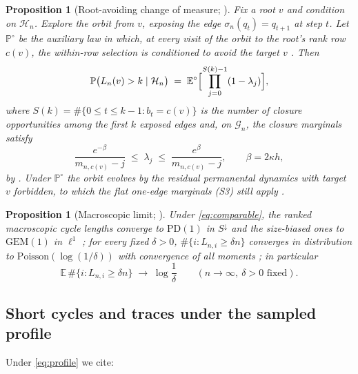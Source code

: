 \documentclass[11pt]{article}
\newcommand{\E}{\mathbb{E}}
\newcommand{\Prob}{\mathbb{P}}
\newcommand{\1}{\mathbf{1}}
\newcommand{\pd}{\mathrm{PD}(1)}
\newcommand{\GEM}{\mathrm{GEM}(1)}
\newcommand{\Poisson}{\mathrm{Poisson}}
\newcommand{\cG}{\mathcal{G}}
\newcommand{\cH}{\mathcal{H}}
\newtheorem{proposition}[theorem]{Proposition}
\theoremstyle{remark}
\begin{document}
\begin{proposition}[Root-avoiding change of measure; \cite{Lon26}]\label{prop:rootavoid}
Fix a root $v$ and condition on $\cH_n$. Explore the orbit from $v$, exposing
the edge $\sigma_n(q_t)=q_{t+1}$ at step $t$. Let $\Prob^\circ$ be the
auxiliary law in which, at every visit of the orbit to the root's rank row
$c(v)$, the within-row selection is conditioned to avoid the target $v$
\cite[Lemma~6.9]{Lon26}. Then
\begin{equation}\label{eq:survival}
\Prob\bigl(L_n(v)>k\mid\cH_n\bigr)
\;=\;\E^\circ\Bigl[\prod_{j=0}^{S(k)-1}(1-\lambda_j)\Bigr],
\end{equation}
where $S(k)=\#\{0\le t\le k-1:b_t=c(v)\}$ is the number of closure
opportunities among the first $k$ exposed edges and, on $\cG_n$, the closure
marginals satisfy
\begin{equation}\label{eq:hazard-bounds}
\frac{e^{-\beta}}{m_{n,c(v)}-j}\;\le\;\lambda_j\;\le\;
\frac{e^{\beta}}{m_{n,c(v)}-j},\qquad \beta=2\kappa h,
\end{equation}
by \cite[Lemmas~6.6, 6.9]{Lon26}. Under $\Prob^\circ$ the orbit evolves by the
residual permanental dynamics with target $v$ forbidden, to which the flat
one-edge marginals (S3) still apply \cite[Lemma~6.6]{Lon26}.
\end{proposition}

\begin{proposition}[Macroscopic limit; \cite{Lon26}]\label{prop:macro}
Under \eqref{eq:comparable}, the ranked macroscopic cycle lengths converge to
$\pd$ in $S^\downarrow$ and the size-biased ones to $\GEM$ in $\ell^1$
\cite[Theorem~6.1]{Lon26}; for every fixed $\delta>0$,
$\#\{i:L_{n,i}\ge\delta n\}$ converges in distribution to
$\Poisson(\log(1/\delta))$ with convergence of all moments
\cite[Proposition~6.14]{Lon26}; in particular
\begin{equation}\label{eq:macro-count}
\E\,\#\{i:L_{n,i}\ge\delta n\}\;\longrightarrow\;\log\frac1\delta
\qquad(n\to\infty,\ \delta>0\text{ fixed}).
\end{equation}
\end{proposition}

\subsection{Short cycles and traces under the sampled profile}
Under \eqref{eq:profile} we cite:
\end{document}
